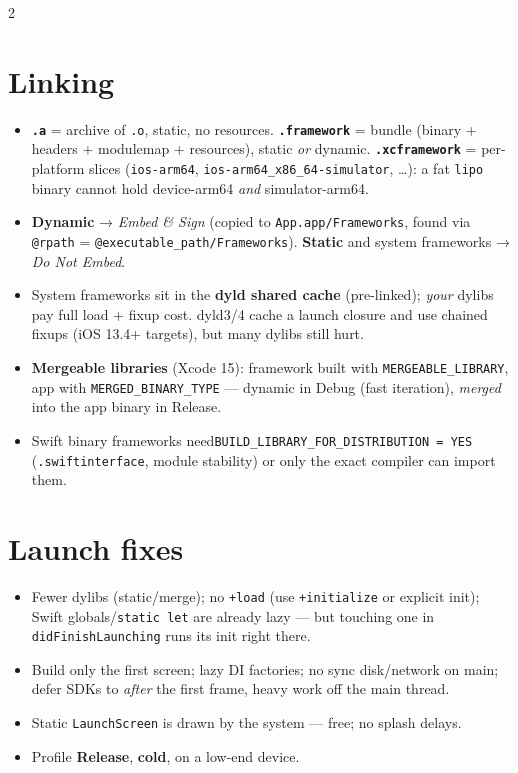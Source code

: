 \documentclass[8pt]{extarticle}
\begin{document}
\begin{multicols}{2}
\raggedright

\section{Linking}
\begin{itemize}
  \item \textbf{\texttt{.a}} = archive of \texttt{.o}, static, no resources.
        \textbf{\texttt{.framework}} = bundle (binary + headers + modulemap + resources),
        static \emph{or} dynamic. \textbf{\texttt{.xcframework}} = per-platform slices
        (\texttt{ios-arm64}, \texttt{ios-arm64\_x86\_64-simulator}, …): a fat
        \texttt{lipo} binary cannot hold device-arm64 \emph{and} simulator-arm64.
  \item \textbf{Dynamic} → \emph{Embed \& Sign} (copied to \texttt{App.app/Frameworks},
        found via \texttt{@rpath} = \texttt{@executable\_path/Frameworks}\unverified).
        \textbf{Static} and system frameworks → \emph{Do Not Embed}.
  \item System frameworks sit in the \textbf{dyld shared cache} (pre-linked); \emph{your}
        dylibs pay full load + fixup cost. dyld3/4 cache a launch closure and use chained
        fixups (iOS 13.4+ targets), but many dylibs still hurt.
  \item \textbf{Mergeable libraries} (Xcode 15): framework built with
        \texttt{MERGEABLE\_LIBRARY}, app with \texttt{MERGED\_BINARY\_TYPE} — dynamic
        in Debug (fast iteration), \emph{merged} into the app binary in Release.
  \item Swift binary frameworks need\newline\texttt{BUILD\_LIBRARY\_FOR\_DISTRIBUTION = YES}
        (\texttt{.swiftinterface}, module stability) or only the exact compiler can import them.
\end{itemize}

\section{Launch fixes}
\begin{itemize}
  \item Fewer dylibs (static/merge); no \texttt{+load} (use \texttt{+initialize} or
        explicit init); Swift globals/\texttt{static let} are already lazy — but touching
        one in \texttt{didFinishLaunching} runs its init right there.
  \item Build only the first screen; lazy DI factories; no sync disk/network on main;
        defer SDKs to \emph{after} the first frame, heavy work off the main thread.
  \item Static \texttt{LaunchScreen} is drawn by the system — free; no splash delays.
  \item Profile \textbf{Release}, \textbf{cold}, on a low-end device.
\end{itemize}


\end{multicols}
\end{document}
